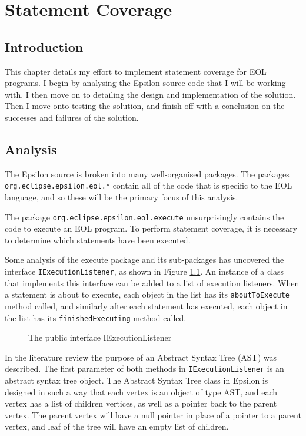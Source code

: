 \chapter{Statement Coverage}

\section{Introduction}

This chapter details my effort to implement statement coverage for EOL programs. I begin by analysing the Epsilon source code that I will be working with. I then move on to detailing the design and implementation of the solution. Then I move onto testing the solution, and finish off with a conclusion on the successes and failures of the solution.

\section{Analysis}

The Epsilon source is broken into many well-organised packages. The packages \verb+org.eclipse.epsilon.eol.*+ contain all of the code that is specific to the EOL language, and so these will be the primary focus of this analysis.

The package \verb+org.eclipse.epsilon.eol.execute+ unsurprisingly contains the code to execute an EOL program. To perform statement coverage, it is necessary to determine which statements have been executed. 

Some analysis of the execute package and its sub-packages has uncovered the interface \verb+IExecutionListener+, as shown in Figure \ref{lst:IExecutionListener}. An instance of a class that implements this interface can be added to a list of execution listeners. When a statement is about to execute, each object in the list has its \verb+aboutToExecute+ method called, and similarly after each statement has executed, each object in the list has its \verb+finishedExecuting+ method called.

\begin{figure}
	
	\caption{The public interface IExecutionListener}
	\label{lst:IExecutionListener}
\end{figure}

In the literature review the purpose of an Abstract Syntax Tree (AST) was described. The first parameter of both methods in \verb+IExecutionListener+ is an abstract syntax tree object. The Abstract Syntax Tree class in Epsilon is designed in such a way that each vertex is an object of type AST, and each vertex has a list of children vertices, as well as a pointer back to the parent vertex. The parent vertex will have a null pointer in place of a pointer to a parent vertex, and leaf of the tree will have an empty list of children.

